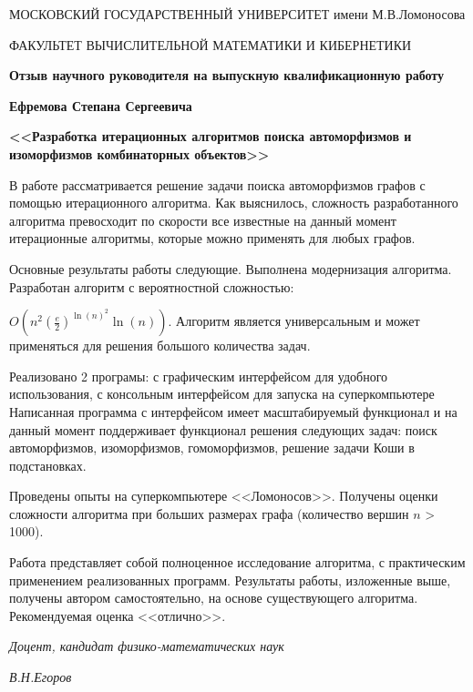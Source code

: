\documentclass[oneside,final,12pt,a4paper]{extreport}
\begin{document}
\begin{center}
{
\large
МОСКОВСКИЙ ГОСУДАРСТВЕННЫЙ УНИВЕРСИТЕТ имени М.В.Ломоносова
\newline

ФАКУЛЬТЕТ ВЫЧИСЛИТЕЛЬНОЙ МАТЕМАТИКИ
И КИБЕРНЕТИКИ
}
\newline

\textbf{Отзыв научного руководителя на выпускную квалификационную работу}

\textbf{Ефремова Степана Сергеевича}

\textbf{<<Разработка итерационных алгоритмов поиска автоморфизмов и изоморфизмов комбинаторных объектов>>}

\end{center}

В работе рассматривается решение задачи поиска автоморфизмов графов с помощью итерационного алгоритма. Как выяснилось, сложность разработанного алгоритма превосходит по скорости все известные на данный момент итерационные алгоритмы, которые можно применять для любых графов.

Основные результаты работы следующие. Выполнена модернизация алгоритма. Разработан алгоритм с вероятностной сложностью:

$O(n^2(\frac{e}{2})^{\ln(n)^2} \ln(n))$.
Алгоритм является универсальным и может применяться для решения большого количества задач.

Реализовано 2 програмы: с графическим интерфейсом для удобного использования, с консольным интерфейсом для запуска на суперкомпьютере
Написанная программа с интерфейсом имеет масштабируемый функционал и на  данный момент поддерживает функционал решения следующих задач: поиск автоморфизмов, изоморфизмов, гомоморфизмов, решение задачи Коши в подстановках.

Проведены опыты на суперкомпьютере <<Ломоносов>>. Получены оценки сложности алгоритма при больших размерах графа (количество вершин $n$ > 1000).


Работа представляет собой полноценное исследование алгоритма, с практическим применением реализованных программ. Результаты работы, изложенные выше, получены автором самостоятельно, на основе существующего алгоритма. Рекомендуемая оценка <<отлично>>.

\begin{flushleft}
\textit{Доцент, кандидат физико-математических наук}
\newline

\textit{В.Н.Егоров}
\end{flushleft}
\end{document}
